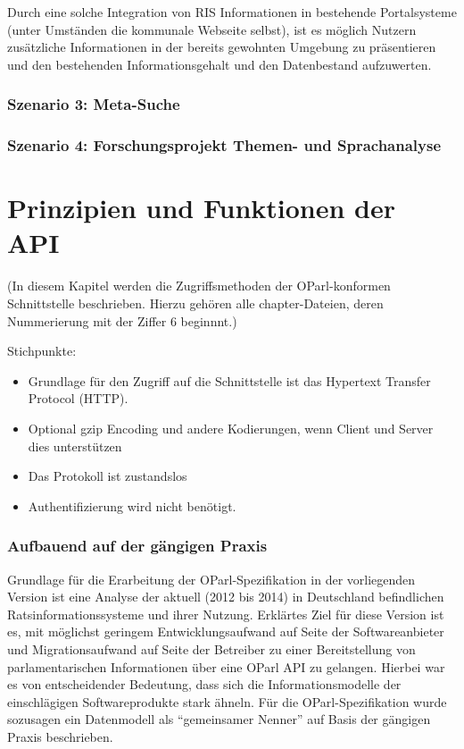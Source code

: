 \documentclass[,a4paper]{article}
\begin{document}
Durch eine solche Integration von RIS Informationen in bestehende
Portalsysteme (unter Umständen die kommunale Webseite selbst), ist es
möglich Nutzern zusätzliche Informationen in der bereits gewohnten
Umgebung zu präsentieren und den bestehenden Informationsgehalt und den
Datenbestand aufzuwerten.

\subsubsection{Szenario 3: Meta-Suche}

\subsubsection{Szenario 4: Forschungsprojekt Themen- und Sprachanalyse}

\section{Prinzipien und Funktionen der API}

(In diesem Kapitel werden die Zugriffsmethoden der OParl-konformen
Schnittstelle beschrieben. Hierzu gehören alle chapter-Dateien, deren
Nummerierung mit der Ziffer 6 beginnnt.)

Stichpunkte:

\begin{itemize}
\item
  Grundlage für den Zugriff auf die Schnittstelle ist das Hypertext
  Transfer Protocol (HTTP).
\item
  Optional gzip Encoding und andere Kodierungen, wenn Client und Server
  dies unterstützen
\item
  Das Protokoll ist zustandslos
\item
  Authentifizierung wird nicht benötigt.
\end{itemize}


\subsubsection{Aufbauend auf der gängigen Praxis}

Grundlage für die Erarbeitung der OParl-Spezifikation in der
vorliegenden Version ist eine Analyse der aktuell (2012 bis 2014) in
Deutschland befindlichen Ratsinformationssysteme und ihrer Nutzung.
Erklärtes Ziel für diese Version ist es, mit möglichst geringem
Entwicklungsaufwand auf Seite der Softwareanbieter und Migrationsaufwand
auf Seite der Betreiber zu einer Bereitstellung von parlamentarischen
Informationen über eine OParl API zu gelangen. Hierbei war es von
entscheidender Bedeutung, dass sich die Informationsmodelle der
einschlägigen Softwareprodukte stark ähneln. Für die OParl-Spezifikation
wurde sozusagen ein Datenmodell als ``gemeinsamer Nenner'' auf Basis der
gängigen Praxis beschrieben.
\end{document}
